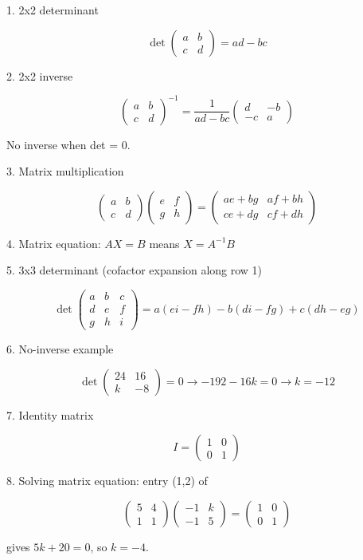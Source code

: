 1. 2x2 determinant

$$ \det \begin{pmatrix} a & b \\ c & d \end{pmatrix} = ad - bc $$

2. 2x2 inverse

$$ \begin{pmatrix} a & b \\ c & d \end{pmatrix}^{-1} = \frac{1}{ad-bc} \begin{pmatrix} d & -b \\ -c & a \end{pmatrix} $$

No inverse when det = 0.

3. Matrix multiplication

$$ \begin{pmatrix} a & b \\ c & d \end{pmatrix} \begin{pmatrix} e & f \\ g & h \end{pmatrix} = \begin{pmatrix} ae+bg & af+bh \\ ce+dg & cf+dh \end{pmatrix} $$

4. Matrix equation: $AX = B$ means $X = A^{-1}B$

5. 3x3 determinant (cofactor expansion along row 1)

$$ \det \begin{pmatrix} a & b & c \\ d & e & f \\ g & h & i \end{pmatrix} = a(ei-fh) - b(di-fg) + c(dh-eg) $$

6. No-inverse example

$$ \det \begin{pmatrix} 24 & 16 \\ k & -8 \end{pmatrix} = 0 \rightarrow -192-16k=0 \rightarrow k=-12 $$

7. Identity matrix

$$ I = \begin{pmatrix} 1 & 0 \\ 0 & 1 \end{pmatrix} $$

8. Solving matrix equation: entry (1,2) of

$$ \begin{pmatrix} 5 & 4 \\ 1 & 1 \end{pmatrix} \begin{pmatrix} -1 & k \\ -1 & 5 \end{pmatrix} = \begin{pmatrix} 1 & 0 \\ 0 & 1 \end{pmatrix} $$

gives $5k + 20 = 0$, so $k = -4$.
